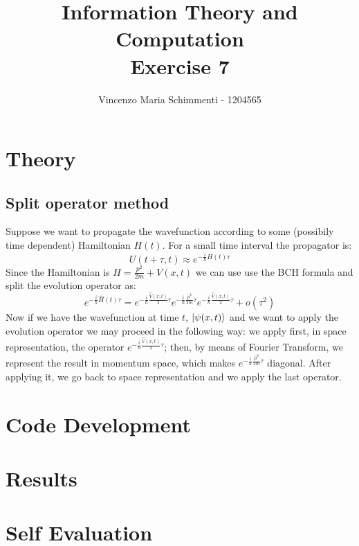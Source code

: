 \documentclass{article}
\title{%
	Information Theory and Computation \\
	Exercise  7}
\author{Vincenzo Maria Schimmenti - 1204565}
\begin{document}
\maketitle
 
\section*{Theory}
\subsection*{Split operator method}
Suppose we want to propagate the wavefunction according to some (possibily time dependent) Hamiltonian $H(t)$. For a small time interval the propagator is:
\begin{equation}
	U(t+\tau,t) \approx e^{-\frac{i}{\hbar}H(t) \tau}
\end{equation}
Since the Hamiltonian is $H=\frac{p^2}{2m}+V(x,t)$ we can use use the BCH formula and split the evolution operator as:
\begin{equation}
	e^{-\frac{i}{\hbar}\hat{H}(t) \tau} = e^{-\frac{i}{\hbar}\frac{\hat{V}(x,t)}{2} \tau} e^{-\frac{i}{\hbar} \frac{\hat{p}^2}{2m} \tau}  e^{-\frac{i}{\hbar}\frac{\hat{V}(x,t)}{2} \tau} +o(\tau^2)
\end{equation}
Now if we have the wavefunction at time $t$, $\ket{\psi(x,t)}$ and we want to apply the evolution operator we may proceed in the following way: we apply first, in space representation, the operator $e^{-\frac{i}{\hbar}\frac{\hat{V}(x,t)}{2} \tau}$; then, by means of Fourier Transform, we represent the result in momentum space, which makes $e^{-\frac{i}{\hbar} \frac{\hat{p}^2}{2m} \tau}$ diagonal. After applying it, we go back to space representation and we apply the last operator. 
\section*{Code Development}
\section*{Results}
\section*{Self Evaluation}
 
\end{document}
